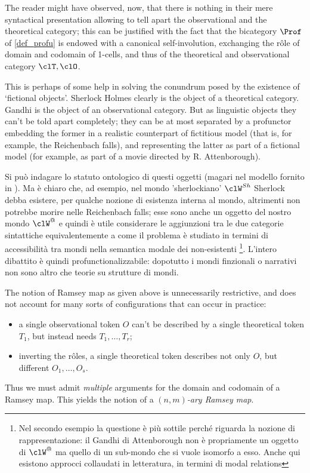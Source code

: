 \color{black}
\begin{remark}
	The reader might have observed, now, that there is nothing in their mere syntactical presentation allowing to tell apart the observational and the theoretical category; this can be justified with the fact that the bicategory $\Prof$ of \autoref{def_profu} is endowed with a canonical self-involution, exchanging the r\^ole of domain and codomain of 1-cells, and thus of the theoretical and observational category $\clT,\clO$.
	
	This is perhaps of some help in solving the conundrum posed by the existence of `fictional objects'. Sherlock Holmes clearly is the object of a theoretical category. Gandhi is the object of an observational category. But as linguistic objects they can't be told apart completely; they can be at most separated by a profunctor embedding the former in a realistic counterpart of fictitious model (that is, for example, the Reichenbach falls), and representing the latter as part of a fictional model (for example, as part of a movie directed by R. Attenborough).

	Si può indagare lo statuto ontologico di questi oggetti (magari nel modello fornito in \cite{catont1}). Ma è chiaro che, ad esempio, nel mondo 'sherlockiano' $\clW^{Sh}$ Sherlock debba esistere, per qualche nozione di esistenza interna al mondo, altrimenti non potrebbe morire nelle Reichenbach falls; esse sono anche un oggetto del nostro mondo $\clW^@$ e quindi è utile considerare le aggiunzioni tra le due categorie sintattiche equivalentemente a come il problema è studiato in termini di accessibilità tra mondi nella semantica modale dei non-esistenti \cite{} \footnote{Nel secondo esempio la questione è più sottile perché riguarda la nozione di rappresentazione: il Gandhi di Attenborough non è propriamente un oggetto di $\clW^@$ ma quello di un sub-mondo che si vuole isomorfo a esso. Anche qui esistono approcci collaudati in letteratura, in termini di modal relations}. L'intero dibattito è quindi profunctionalizzabile: dopotutto i mondi finzionali o narrativi non sono altro che teorie su strutture di mondi. 
\end{remark}
\begin{remark}\label{multiramsey}
	The notion of Ramsey map as given above is unnecessarily restrictive, and does not account for many sorts of configurations that can occur in practice:
	\begin{itemize}
		\item a single observational token $O$ can't be described by a single theoretical token $T_1$, but instead needs $T_1,\dots,T_r$;
		\item inverting the r\^oles, a single theoretical token describes not only $O$, but different $O_1,\dots,O_s$.
	\end{itemize}
	Thus we must admit \emph{multiple} arguments for the domain and codomain of a Ramsey map. This yields the notion of a \emph{$(n,m)$-ary Ramsey map}.
\end{remark}
